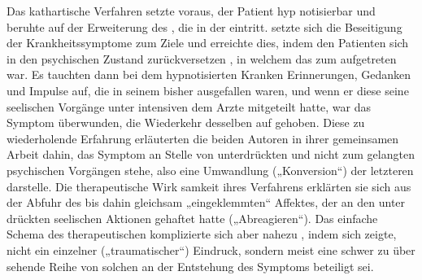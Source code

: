 \documentclass[twoside=true,titlepage=false,open=any, parskip=never, fontsize=10pt, headings=small, chapterprefix=false, appendixprefix=false]{scrbook}
\begin{document}
        \pstart
        Das kathartische Verfahren setzte voraus,  der Patient hyp
notisierbar und beruhte auf der Erweiterung des ,
 die in der  eintritt.  setzte sich die Beseitigung der
 Krankheitssymptome zum Ziele und
               erreichte dies, indem  den
 Patienten sich in den psychischen Zustand zurückversetzen ,
 in welchem das  zum  aufgetreten war. Es
 tauchten dann bei dem hypnotisierten Kranken
               Erinnerungen,
 Gedanken und Impulse auf, die in seinem  bisher
 ausgefallen waren, und wenn er diese seine seelischen Vorgänge 
unter intensiven  dem Arzte mitgeteilt hatte,
 war das Symptom überwunden, die Wiederkehr
               desselben auf
gehoben. Diese  zu wiederholende Erfahrung erläuterten
 die beiden Autoren in ihrer
               gemeinsamen Arbeit dahin,  das
 Symptom an Stelle von unterdrückten und nicht zum  gelangten psychischen Vorgängen stehe, also eine Umwandlung
               („Konversion“) der letzteren darstelle. Die therapeutische Wirk
samkeit ihres Verfahrens erklärten sie sich aus der Abfuhr des
 bis dahin gleichsam „eingeklemmten“ Affektes,
               der an den unter
drückten seelischen Aktionen gehaftet hatte
               („Abreagieren“). Das
 einfache Schema des therapeutischen komplizierte sich
 aber nahezu , indem sich zeigte,  nicht ein einzelner
 („traumatischer“) Eindruck, sondern meist eine schwer
               zu über
sehende Reihe von solchen an der Entstehung des Symptoms
               beteiligt sei.
        \pend
    
\end{document}
